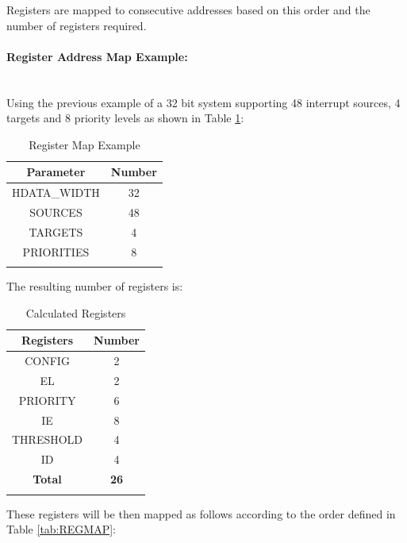 Registers are mapped to consecutive addresses based on this order and the
number of registers required.  

\paragraph{Register Address Map Example:} ~\\

Using the previous example of a 32 bit system supporting 48 interrupt sources, 4 targets and 8 priority levels as shown in Table \ref{tab:REGMAPEX}:

\begin{longtable}[c]{@{}cc@{}}	
		\toprule 
		\textbf{Parameter} & \textbf{Number}\\
		\midrule 
		\endhead
		HDATA\_WIDTH & 32\\
		SOURCES & 48\\
		TARGETS & 4\\
		PRIORITIES & 8\\
		\bottomrule 	
 
	\caption{Register Map Example}
	\label{tab:REGMAPEX}
\end{longtable}

The resulting number of registers is:

\begin{longtable}[c]{@{}cc@{}}	
		\toprule 
		\textbf{Registers} & \textbf{Number}\\
		\midrule 
		\endhead
		CONFIG & 2\\
		EL & 2\\
		PRIORITY & 6\\
		IE & 8\\
		THRESHOLD & 4\\
		ID & 4\\
		\midrule
		\textbf{Total} & \textbf{26}\\
		\bottomrule 	
	\caption{Calculated Registers}
	\label{tab:REGMAPNUM}
\end{longtable}

These registers will be then mapped as follows according to the order
defined in Table \ref{tab:REGMAP}:

